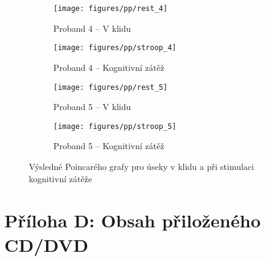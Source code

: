 \begin{figure}[H]\ContinuedFloat 
    \centering
    \begin{subfigure}{0.45\textwidth}
        \centering
        \texttt{[image: figures/pp/rest\_4]}
        \caption{Proband 4 -- V klidu}
    \end{subfigure}
    \hspace{12pt}
    \begin{subfigure}{0.45\textwidth}
        \centering
        \texttt{[image: figures/pp/stroop\_4]}
        \caption{Proband 4 -- Kognitivní zátěž}
    \end{subfigure}
    \par\bigskip
    \begin{subfigure}{0.45\textwidth}
        \centering
        \texttt{[image: figures/pp/rest\_5]}
        \caption{Proband 5 -- V klidu}
    \end{subfigure}
    \hspace{12pt}
    \begin{subfigure}{0.45\textwidth}
        \centering
        \texttt{[image: figures/pp/stroop\_5]}
        \caption{Proband 5 -- Kognitivní zátěž}
    \end{subfigure}
    \caption{Výsledné Poincarého grafy pro úseky v klidu a při stimulaci kognitivní zátěže}
    \label{fig:attachment_poincares_plots}
\end{figure}

\clearpage

\section*{Příloha D: Obsah přiloženého CD/DVD}
\label{att:data}

